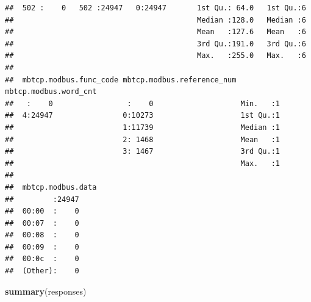 \documentclass[]{article}
\newenvironment{Shaded}{\begin{snugshade}}{\end{snugshade}}
\newcommand{\KeywordTok}[1]{\textcolor[rgb]{0.13,0.29,0.53}{\textbf{{#1}}}}
\newcommand{\NormalTok}[1]{{#1}}
\begin{document}
\begin{verbatim}
##  502 :    0   502 :24947   0:24947       1st Qu.: 64.0   1st Qu.:6  
##                                          Median :128.0   Median :6  
##                                          Mean   :127.6   Mean   :6  
##                                          3rd Qu.:191.0   3rd Qu.:6  
##                                          Max.   :255.0   Max.   :6  
##                                                                     
##  mbtcp.modbus.func_code mbtcp.modbus.reference_num mbtcp.modbus.word_cnt
##   :    0                 :    0                    Min.   :1            
##  4:24947                0:10273                    1st Qu.:1            
##                         1:11739                    Median :1            
##                         2: 1468                    Mean   :1            
##                         3: 1467                    3rd Qu.:1            
##                                                    Max.   :1            
##                                                                         
##  mbtcp.modbus.data
##         :24947    
##  00:00  :    0    
##  00:07  :    0    
##  00:08  :    0    
##  00:09  :    0    
##  00:0c  :    0    
##  (Other):    0
\end{verbatim}

\begin{Shaded}
\begin{Highlighting}[]
\KeywordTok{summary}\NormalTok{(responses)}
\end{Highlighting}
\end{Shaded}
\end{document}
